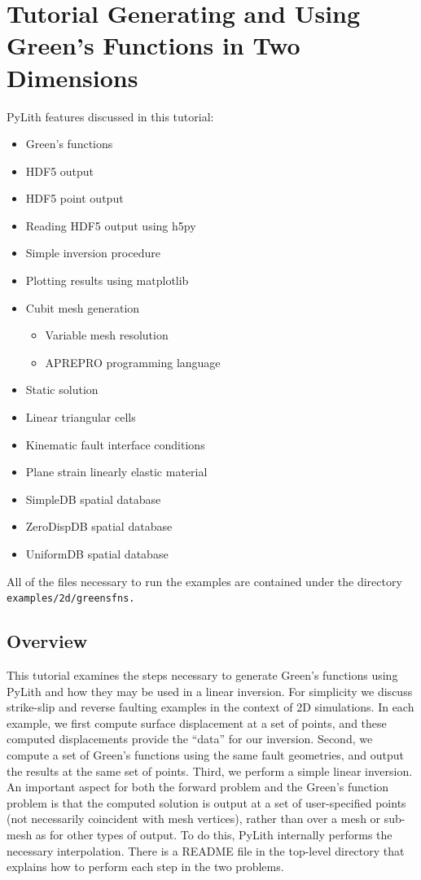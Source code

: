 
\section{\label{sec:Tutorial-Greensfns-2d}Tutorial Generating and Using Green's
Functions in Two Dimensions}

PyLith features discussed in this tutorial:
\begin{itemize}
\item Green's functions
\item HDF5 output
\item HDF5 point output
\item Reading HDF5 output using h5py
\item Simple inversion procedure
\item Plotting results using matplotlib
\item Cubit mesh generation

\begin{itemize}
\item Variable mesh resolution
\item APREPRO programming language
\end{itemize}
\item Static solution
\item Linear triangular cells
\item Kinematic fault interface conditions
\item Plane strain linearly elastic material
\item SimpleDB spatial database
\item ZeroDispDB spatial database
\item UniformDB spatial database
\end{itemize}
All of the files necessary to run the examples are contained under
the directory \texttt{examples/2d/greensfns.}


\subsection{Overview}

This tutorial examines the steps necessary to generate Green's functions
using PyLith and how they may be used in a linear inversion. For simplicity
we discuss strike-slip and reverse faulting examples in the context
of 2D simulations. In each example, we first compute surface displacement
at a set of points, and these computed displacements provide the ``data''
for our inversion. Second, we compute a set of Green's functions using
the same fault geometries, and output the results at the same set
of points. Third, we perform a simple linear inversion. An important
aspect for both the forward problem and the Green's function problem
is that the computed solution is output at a set of user-specified
points (not necessarily coincident with mesh vertices), rather than
over a mesh or sub-mesh as for other types of output. To do this,
PyLith internally performs the necessary interpolation. There is a
README file in the top-level directory that explains how to perform
each step in the two problems.



